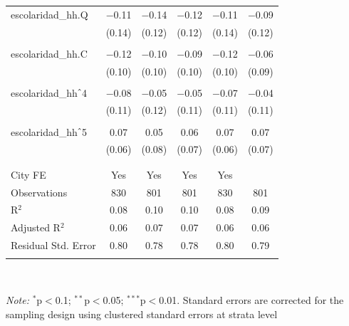 \begin{table}[H]
\begin{tabularx}{0.9\textwidth}{@{\extracolsep{-7pt}}lccccc}
escolaridad\_hh.Q & $-$0.11 & $-$0.14 & $-$0.12 & $-$0.11 & $-$0.09 \\    & (0.14) & (0.12) & (0.12) & (0.14) & (0.12) \\    & & & & & \\   escolaridad\_hh.C & $-$0.12 & $-$0.10 & $-$0.09 & $-$0.12 & $-$0.06 \\    & (0.10) & (0.10) & (0.10) & (0.10) & (0.09) \\    & & & & & \\   escolaridad\_hh$\hat{\mkern6mu}$4 & $-$0.08 & $-$0.05 & $-$0.05 & $-$0.07 & $-$0.04 \\    & (0.11) & (0.12) & (0.11) & (0.11) & (0.11) \\    & & & & & \\   escolaridad\_hh$\hat{\mkern6mu}$5 & 0.07 & 0.05 & 0.06 & 0.07 & 0.07 \\    & (0.06) & (0.08) & (0.07) & (0.06) & (0.07) \\    & & & & & \\  \hline \\[-1.8ex]  City FE & Yes & Yes & Yes & Yes &  \\  Observations & 830 & 801 & 801 & 830 & 801 \\  R$^{2}$ & 0.08 & 0.10 & 0.10 & 0.08 & 0.09 \\  Adjusted R$^{2}$ & 0.06 & 0.07 & 0.07 & 0.06 & 0.06 \\  Residual Std. Error & 0.80 & 0.78 & 0.78 & 0.80 & 0.79 \\  \hline  \hline \\[-1.8ex]  \end{tabularx} \\ \parbox[]{\textwidth}{\textit{Note:} $^{*}$p$<$0.1; $^{**}$p$<$0.05; $^{***}$p$<$0.01. Standard errors are corrected for the sampling design using clustered standard errors at strata level }  \end{table} 